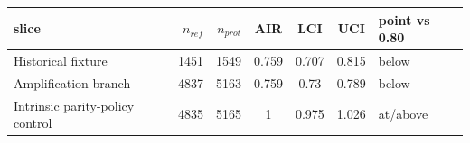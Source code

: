\AccessibleTableHeaderRow
\begin{tabular}{lrrSSSl}
\toprule
slice & {$n_{ref}$} & {$n_{prot}$} & {AIR} & {LCI} & {UCI} & {point vs 0.80}\\
\midrule
Historical fixture & 1451 & 1549 & \num{0.759} & \num{0.707} & \num{0.815} & below\\
Amplification branch & 4837 & 5163 & \num{0.759} & \num{0.73} & \num{0.789} & below\\
Intrinsic parity-policy control & 4835 & 5165 & \num{1} & \num{0.975} & \num{1.026} & at/above\\
\bottomrule
\end{tabular}
